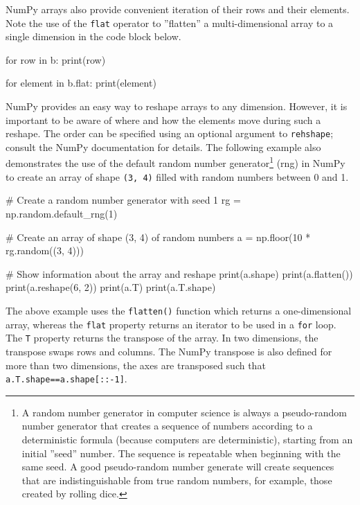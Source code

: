 NumPy arrays also provide convenient iteration of their rows and their elements. Note the use of the \texttt{flat} operator to ''flatten'' a multi-dimensional array to a single dimension in the code block below.

\begin{samepage}
\begin{pythoncode}
for row in b:
    print(row)

for element in b.flat:
    print(element)
\end{pythoncode}
\end{samepage}

NumPy provides an easy way to reshape arrays to any dimension. However, it is important to be aware of where and how the elements move during such a reshape. The order can be specified using an optional argument to \texttt{rehshape}; consult the NumPy documentation for details. The following example also demonstrates the use of the default random number generator\footnote{A random number generator in computer science is always a pseudo-random number generator that creates a sequence of numbers according to a deterministic formula (because computers are deterministic), starting from an initial ''seed'' number. The sequence is repeatable when beginning with the same seed. A good pseudo-random number generate will create sequences that are indistinguishable from true random numbers, for example, those created by rolling dice.} (rng) in NumPy to create an array of shape \texttt{(3, 4)} filled with random numbers between 0 and 1.

\begin{samepage}
\begin{pythoncode}
# Create a random number generator with seed 1
rg = np.random.default_rng(1)

# Create an array of shape (3, 4) of random numbers
a = np.floor(10 * rg.random((3, 4)))

# Show information about the array and reshape
print(a.shape)
print(a.flatten())
print(a.reshape(6, 2))
print(a.T)
print(a.T.shape)
\end{pythoncode}
\end{samepage}

The above example uses the \texttt{flatten()} function which returns a one-dimensional array, whereas the \texttt{flat} property returns an iterator to be used in a \texttt{for} loop. The \texttt{T} property returns the transpose of the array. In two dimensions, the transpose swaps rows and columns. The NumPy transpose is also defined for more than two dimensions, the axes are transposed such that \texttt{a.T.shape==a.shape[::-1]}.

